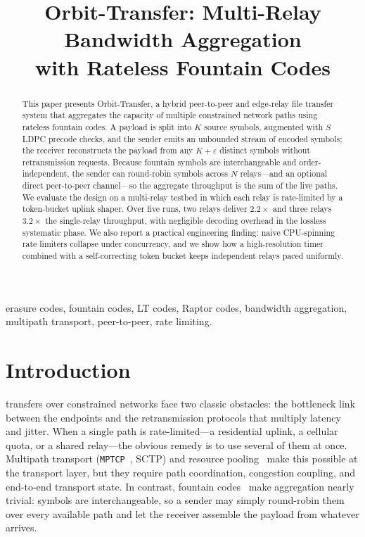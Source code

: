 \documentclass[conference]{IEEEtran}
\begin{document}
\title{Orbit-Transfer: Multi-Relay Bandwidth Aggregation\\ with Rateless Fountain Codes}

\author{
}

\maketitle

\begin{abstract}
This paper presents Orbit-Transfer, a hybrid peer-to-peer and edge-relay file
transfer system that aggregates the capacity of multiple constrained network
paths using rateless fountain codes. A payload is split into $K$ source
symbols, augmented with $S$ LDPC precode checks, and the sender emits an
unbounded stream of encoded symbols; the receiver reconstructs the payload
from any $K+\varepsilon$ distinct symbols without retransmission requests.
Because fountain symbols are interchangeable and order-independent, the
sender can round-robin symbols across $N$ relays---and an optional direct
peer-to-peer channel---so the aggregate throughput is the sum of the live
paths. We evaluate the design on a multi-relay testbed in which each relay is
rate-limited by a token-bucket uplink shaper. Over five runs, two relays
deliver $2.2\times$ and three relays $3.2\times$ the single-relay throughput,
with negligible decoding overhead in the lossless systematic phase. We also
report a practical engineering finding: naive CPU-spinning rate limiters
collapse under concurrency, and we show how a high-resolution timer combined
with a self-correcting token bucket keeps independent relays paced uniformly.
\end{abstract}

\begin{IEEEkeywords}
erasure codes, fountain codes, LT codes, Raptor codes, bandwidth aggregation,
multipath transport, peer-to-peer, rate limiting.
\end{IEEEkeywords}

\section{Introduction}
 transfers over constrained networks face two classic
obstacles: the bottleneck link between the endpoints and the retransmission
protocols that multiply latency and jitter. When a single path is
rate-limited---a residential uplink, a cellular quota, or a shared relay---the
obvious remedy is to use several of them at once. Multipath transport
(\texttt{MPTCP}~\cite{rfc6824}, SCTP) and resource pooling~\cite{wischik2008survey}
make this possible at the transport layer, but they require path coordination,
congestion coupling, and end-to-end transport state. In contrast, fountain
codes~\cite{byers1998digital,luby2002lt,mackay2005fountain} make aggregation
nearly trivial: symbols are interchangeable, so a sender may simply round-robin
them over every available path and let the receiver assemble the payload from
whatever arrives.
\end{document}
